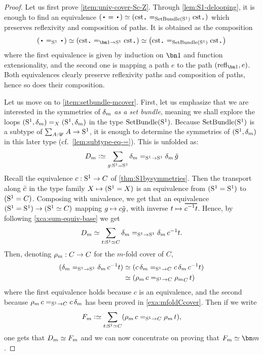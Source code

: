 \begin{proof}
  Let us first prove \ref{item:univ-cover-Sc-Z}. Through
  \cref{lem:S1-delooping}, it is enough to find an equivalence
  $(\base = \base) \weq (\cst\base =_{\SetBundle(\Sc)} \cst\base)$
  which preserves reflexivity and composition of paths. It is obtained
  as the composition
  \begin{displaymath}
    \left(\base =_{\Sc} \base\right) \weq \left( \cst\base=_{\bn 1\to \Sc}\cst\base \right)
    \weq \left( \cst\base =_{\SetBundle(\Sc)} \cst\base \right)
  \end{displaymath}
  where the first equivalence is given by induction on $\bn 1$ and
  function extensionality, and the second one is mapping a path $e$ to
  the path $(\refl{\bn 1}, e)$. Both equivalences clearly preserve
  reflexivity paths and composition of paths, hence so does their
  composition.

  Let us move on to \ref{item:setbundle-mcover}. %
  First, let us emphasize that we are interested in the symmetries of
  $\dg{m}$ \emph{as a set bundle}, meaning we shall explore
  the loops $(\Sc,\dg{m}) =_X (\Sc,\dg{m})$ in the type
  $\mathrm{SetBundle}({\mathrm{S}^1})$.
  Because $\mathrm{SetBundle}({\mathrm{S}^1})$ is a subtype of $\sum_{A:{\mathscr{U}}}A\to {\mathrm{S}^1}$, it
  is enough to determine the symmetries of $(\Sc,\dg{m})$ in this later
  type (cf.\ \cref{lem:subtype-eq-=}). This is unfolded as:
  \begin{displaymath}
    D_m \defequi \sum_{g:\Sc = \Sc}\dg{m} =_{\Sc \to \Sc} \dg{m}\ptoe g
  \end{displaymath}
  Recall the equivalence $c: {\mathrm{S}^1} \to C$ of
  \cref{thm:S1bysymmetries}. Then the transport along $\bar {c}$ in the
  type family $X\mapsto ({\mathrm{S}^1}=X)$ is an equivalence from $({\mathrm{S}^1} = {\mathrm{S}^1})$
  to $({\mathrm{S}^1} = C)$. Composing with univalence, we get that an
  equivalence $({\mathrm{S}^1}={\mathrm{S}^1}) \to ({\mathrm{S}^1} \simeq C)$ mapping
  $g\mapsto c\tilde {g}$, with inverse
  $t \mapsto \overetop{\inv{c} t}$.
  Hence, by following \cref{xca:sum-equiv-base} we get
  \begin{displaymath}
    D_m \weq  \sum_{t:\Sc \weq C} \dg{m} =_{\Sc\to \Sc} \dg{m}\inv c t.
  \end{displaymath}
  Then, denoting $\cdg{m}: C \to C$ for the $m$-fold cover of $C$,
  \begin{displaymath}
    \begin{split}
      (\dg{m} =_{\Sc\to \Sc} \dg{m}\inv c t) %
      &\weq (c \dg{m} =_{\Sc\to C} c \dg{m} \inv c t)
      \\
      &\weq (\cdg{m}c =_{\Sc\to C} \cdg{m}_C t)
    \end{split}
  \end{displaymath}
  where the first equivalence holds because $c$ is an equivalence, and
  the second because $\cdg{m}c =_{\Sc\to C} c \dg{m}$ has been
  proved in \cref{exa:mfoldCcover}.
  Then if we write
  \begin{displaymath}
    F_m \defequi \sum_{t:\Sc \weq C}(\cdg{m}c =_{\Sc\to C} \cdg{m} t),
  \end{displaymath}
  one gets that $D_m \simeq F_m$ and we can now concentrate on proving that
  $F_m \weq \bn m$.


\end{proof}
